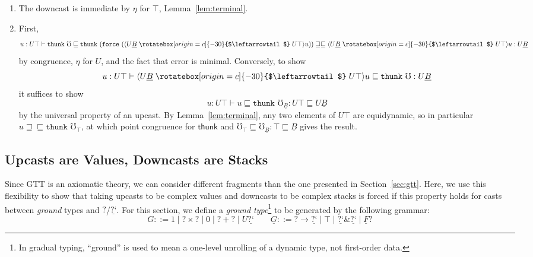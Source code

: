 \documentclass[acmsmall,nonacm]{acmart}
\renewcommand{\u}{\underline}
\newcommand{\ltdyn}{\sqsubseteq}
\newcommand{\gtdyn}{\sqsupseteq}
\newcommand{\equidyn}{\mathrel{\gtdyn\ltdyn}}
\newcommand{\dynv}{{?}}
\newcommand{\dync}{\u {\text{?`}}}
\newcommand{\uarrow}{\mathrel{\rotatebox[origin=c]{-30}{$\leftarrowtail$}}}
\newcommand{\upcast}[2]{\langle{#2}\uarrow{#1}\rangle}
\newcommand{\err}{\mho}
\newcommand{\kw}[1]{\texttt{#1}\,\,}
\newcommand{\thunk}{\kw{thunk}}
\newcommand{\force}{\kw{force}}
\newcommand{\with}{\mathbin{\&}}
\begin{document}
\begin{longonly}
\begin{longproof}
\begin{enumerate}
  \item The downcast is immediate by $\eta$ for $\top$,
    Lemma~\ref{lem:terminal}.  

  \item First,
    \[
    u : U \top \vdash \thunk \err \ltdyn \thunk{(\force{(\upcast{U \top}{U \u B}{u})})} \equidyn {\upcast{U \top}{U \u B}{u}} : U \u B
    \]
    by congruence, $\eta$ for $U$, and the fact that error is minimal.
    Conversely, to show
    \[
    u : U \top \vdash {\upcast{U \top}{U \u B}{u}} \ltdyn \thunk \err  : U \u B
    \]
    it suffices to show
    \[
    u : U \top \vdash u \ltdyn \thunk \err_{\u B}  : U \top \ltdyn U \u B
    \]
    by the universal property of an upcast.  By Lemma~\ref{lem:terminal},
    any two elements of $U \top$ are equidynamic, so in particular $u
    \equidyn \thunk{\err_{\top}}$, at which point congruence for
    $\mathsf{thunk}$ and $\err_\top \ltdyn \err_{\u B } : \top \ltdyn \u
    B$ gives the result.
  \end{enumerate}
\end{longproof}
\end{longonly}

\subsection{Upcasts are Values, Downcasts are Stacks}
\label{sec:upcasts-necessarily-values}

Since GTT is an axiomatic theory, we can consider different fragments
than the one presented in Section~\ref{sec:gtt}.  Here, we use this
flexibility to show that taking upcasts to be complex values and
downcasts to be complex stacks is forced if this property holds for
casts between \emph{ground} types and $\dynv$/$\dync$.  For this section, we define a \emph{ground
  type}\footnote{In gradual
  typing, ``ground'' is used to mean a one-level unrolling of a dynamic type, not first-order data.} to be generated by the following grammar:
  \[
    G ::= 1 \mid \dynv \times \dynv \mid 0 \mid \dynv + \dynv \mid U \dync
    \qquad
    \u G ::= \dynv \to \dync \mid \top \mid \dync \with \dync \mid \u F \dynv
  \]
\end{document}
